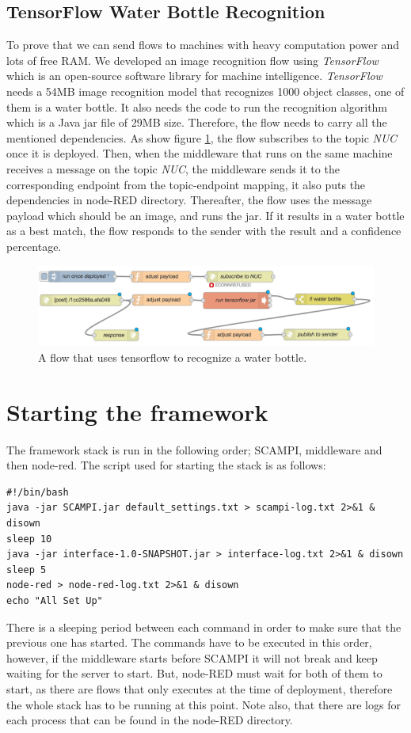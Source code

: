 \subsection{TensorFlow Water Bottle Recognition}
To prove that we can send flows to machines with heavy computation power and lots of free RAM. We developed an image recognition flow using \textit{TensorFlow} which is an open-source software library for machine intelligence. \textit{TensorFlow} needs a 54MB image recognition model that recognizes 1000 object classes, one of them is a water bottle. It also needs the code to run the recognition algorithm which is a Java jar file of 29MB size. Therefore, the flow  needs to carry all the mentioned dependencies. As show figure \ref{fig:flow-tensor}, the flow subscribes to the topic \textit{NUC} once it is deployed. Then, when the middleware that runs on the same machine receives a message on the topic \textit{NUC}, the middleware sends it to the corresponding endpoint  from the topic-endpoint mapping, it also puts the dependencies in node-RED directory. Thereafter, the flow uses the message payload which should be an image, and runs the jar. If it results in a water bottle as a best match, the flow responds to the sender with the result and a confidence percentage.
 \begin{figure}[H]
	\centering
	\includegraphics[scale=0.6]{images/flow-tensor.png}
	\caption{A flow that uses tensorflow to recognize a water bottle.}
	\label{fig:flow-tensor}
\end{figure} 

\section{Starting the framework}\label{subsec:starting-framework}

The framework stack is run in the following order; SCAMPI, middleware and then node-red. The script used for starting the stack is as follows:
\begin{verbatim}
#!/bin/bash
java -jar SCAMPI.jar default_settings.txt > scampi-log.txt 2>&1 & disown
sleep 10
java -jar interface-1.0-SNAPSHOT.jar > interface-log.txt 2>&1 & disown
sleep 5
node-red > node-red-log.txt 2>&1 & disown
echo "All Set Up"
\end{verbatim}
There is a sleeping period between each command in order to make sure that the previous one has started. The commands have to be executed in this order, however, if the middleware starts before SCAMPI it will not break and keep waiting for the server to start. But, node-RED must wait for both of them to start, as there are flows that only executes at the time of deployment, therefore the whole stack has to be running at this point. Note also, that there are logs for each process that can be found in the node-RED directory. 
